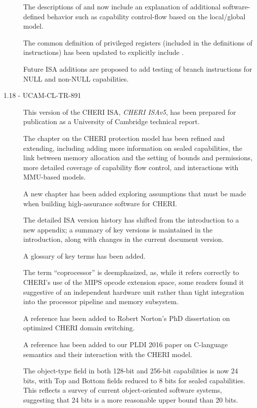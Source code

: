 \begin{description}
  The descriptions of  and  now
  include an explanation of additional software-defined behavior such as
  capability control-flow based on the local/global model.

  The common definition of privileged registers (included in the definitions
  of instructions) has been updated to explicitly include \EPCC{}.

  Future ISA additions are proposed to add testing of branch instructions for
  NULL and non-NULL capabilities.

\item[1.18 - UCAM-CL-TR-891] This version of the CHERI ISA,
  \textit{CHERI ISAv5}, has been prepared for publication as a University of
  Cambridge technical report.

  The chapter on the CHERI protection model has been refined and extending,
  including adding more information on sealed capabilities, the link between
  memory allocation and the setting of bounds and permissions, more detailed
  coverage of capability flow control, and interactions with MMU-based models.

  A new chapter has been added exploring assumptions that must be made when
  building high-assurance software for CHERI.

  The detailed ISA version history has shifted from the introduction to a new
  appendix; a summary of key versions is maintained in the introduction, along
  with changes in the current document version.

  A glossary of key terms has been added.

  The term ``coprocessor'' is deemphasized, as, while it refers correctly to
  CHERI's use of the MIPS opcode extension space, some readers found it
  suggestive of an independent hardware unit rather than tight integration into
  the processor pipeline and memory subsystem.

  A reference has been added to Robert Norton's PhD dissertation on optimized
  CHERI domain switching.

  A reference has been added to our PLDI 2016 paper on C-language semantics and
  their interaction with the CHERI model.

  The object-type field in both 128-bit and 256-bit capabilities is now 24 bits,
  with Top and Bottom fields reduced to 8 bits for sealed capabilities.
  This reflects a survey of current object-oriented software systems, suggesting
  that 24 bits is a more reasonable upper bound than 20 bits.


\end{description}
